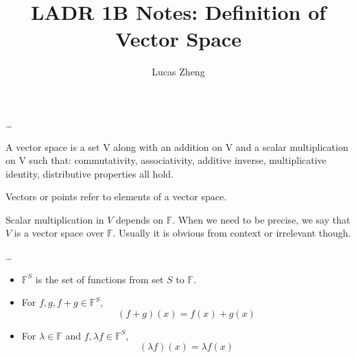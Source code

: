 \documentclass[12pt, letterpaper]{article}
\title{LADR 1B Notes: Definition of Vector Space}
\author{Lucas Zheng}
\date{}
\begin{document}
\maketitle

\begin{tcolorbox}[title={1.18 Definition of addition, scalar multiplication on V}]
\ldots
\end{tcolorbox}

\begin{tcolorbox}[title={1.19 Definition of a vector space}]
A vector space is a set V along with an addition on V and a scalar multiplication on V such that:
commutativity, associativity, additive inverse, multiplicative identity, distributive properties
all hold.
\end{tcolorbox}

\begin{tcolorbox}[title={1.20 Definition of vector, point}]
Vectors or points refer to elements of a vector space.
\end{tcolorbox}

Scalar multiplication in $V$ depends on $\mathbb{F}$. When we need to be precise, we
say that $V$ is a vector space over $\mathbb{F}$. Usually it is obvious from context
or irrelevant though.

\begin{tcolorbox}[title={1.21 Definition of real, complex vector spaces}]
    \ldots
\end{tcolorbox}

\begin{tcolorbox}[title={1.23 Notation $\mathbb{F}^S$}]
    \begin{itemize}
        \item $\mathbb{F}^S$ is the set of functions from set $S$ to $\mathbb{F}$.
        \item For $f,g,f+g\in\mathbb{F}^S$,
        $$(f+g)(x) = f(x) + g(x)$$
        \item For $\lambda\in\mathbb{F}$ and $f,\lambda f\in\mathbb{F}^S$,
        $$(\lambda f)(x)=\lambda f(x)$$
    \end{itemize}
\end{tcolorbox}
\end{document}
